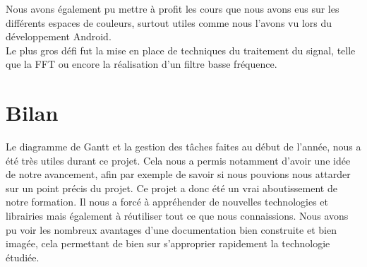 Nous avons également pu mettre à profit les cours que nous avons eus sur les différents espaces de couleurs, surtout utiles comme nous l'avons vu lors du développement Android.\\
Le plus gros défi fut la mise en place de techniques du traitement du signal, telle que la FFT ou encore la réalisation d'un filtre basse fréquence.


\section{Bilan}

Le diagramme de Gantt et la gestion des tâches faites au début de l'année, nous a été très utiles durant ce projet. Cela nous a permis notamment d'avoir une idée de notre avancement, afin par exemple de 
savoir si nous pouvions nous attarder sur un point précis du projet. 
Ce projet a donc été un vrai aboutissement de notre formation. Il nous a forcé à appréhender de nouvelles technologies et librairies mais également à réutiliser tout ce que nous connaissions. Nous avons pu 
voir les nombreux avantages d'une documentation bien construite et bien imagée, cela permettant de bien sur s'approprier rapidement la technologie étudiée.
